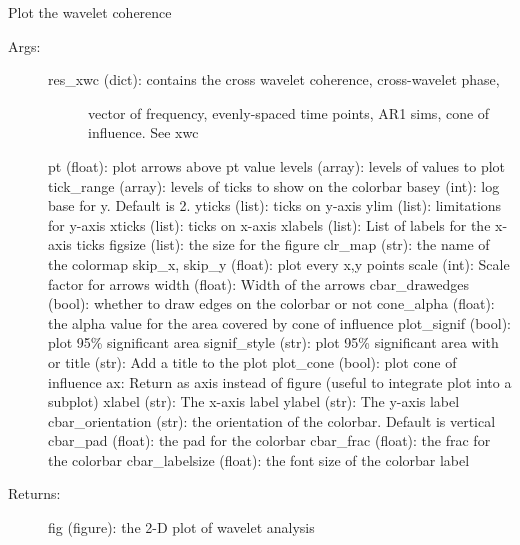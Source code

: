 \documentclass[letterpaper,10pt,english]{sphinxmanual}
\begin{document}
\begin{fulllineitems}
\label{\detokenize{Spectral:pyleoclim.Spectral.plot_coherence}}
Plot the wavelet coherence
\begin{description}
\item[{Args:}] \leavevmode\begin{description}
\item[{res\_xwc (dict): contains the cross wavelet coherence, cross-wavelet phase,}] \leavevmode
vector of frequency, evenly-spaced time points, AR1 sims, 
cone of influence. See xwc

\end{description}

pt (float): plot arrows above pt value
levels (array): levels of values to plot
tick\_range (array): levels of ticks to show on the colorbar
basey (int): log base for y. Default is 2. 
yticks (list): ticks on y-axis
ylim (list): limitations for y-axis
xticks (list): ticks on x-axis
xlabels (list): List of labels for the x-axis ticks
figsize (list): the size for the figure
clr\_map (str): the name of the colormap
skip\_x, skip\_y (float): plot every x,y points
scale (int): Scale factor for arrows
width (float):  Width of the arrows  
cbar\_drawedges (bool): whether to draw edges on the colorbar or not
cone\_alpha (float): the alpha value for the area covered by cone of influence
plot\_signif (bool): plot 95\% significant area
signif\_style (str): plot 95\% significant area with  or 
title (str): Add a title to the plot
plot\_cone (bool): plot cone of influence
ax: Return as axis instead of figure (useful to integrate plot into a subplot)
xlabel (str): The x-axis label
ylabel (str): The y-axis label
cbar\_orientation (str): the orientation of the colorbar. Default is vertical
cbar\_pad (float): the pad for the colorbar
cbar\_frac (float): the frac for the colorbar
cbar\_labelsize (float): the font size of the colorbar label

\item[{Returns:}] \leavevmode
fig (figure): the 2-D plot of wavelet analysis

\end{description}

\end{fulllineitems}
\end{document}
